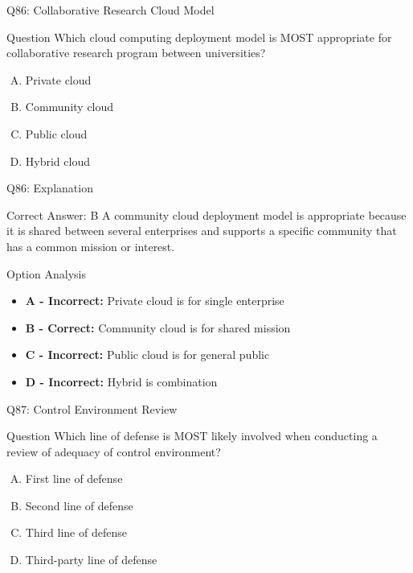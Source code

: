 \documentclass{beamer}
\begin{document}
	\begin{frame}{Q86: Collaborative Research Cloud Model}
		\begin{block}{Question}
			Which cloud computing deployment model is MOST appropriate for collaborative research program between universities?
		\end{block}
		\begin{enumerate}[(A)]
			\item Private cloud
			\item Community cloud
			\item Public cloud
			\item Hybrid cloud
		\end{enumerate}
	\end{frame}
	
	\begin{frame}{Q86: Explanation}
		\begin{block}{Correct Answer: B}
			A community cloud deployment model is appropriate because it is shared between several enterprises and supports a specific community that has a common mission or interest.
		\end{block}
		\begin{block}{Option Analysis}
			\begin{itemize}
				\item \textbf{A - Incorrect:} Private cloud is for single enterprise
				\item \textbf{B - Correct:} Community cloud is for shared mission
				\item \textbf{C - Incorrect:} Public cloud is for general public
				\item \textbf{D - Incorrect:} Hybrid is combination
			\end{itemize}
		\end{block}
	\end{frame}
	
	\begin{frame}{Q87: Control Environment Review}
		\begin{block}{Question}
			Which line of defense is MOST likely involved when conducting a review of adequacy of control environment?
		\end{block}
		\begin{enumerate}[(A)]
			\item First line of defense
			\item Second line of defense
			\item Third line of defense
			\item Third-party line of defense
		\end{enumerate}
	\end{frame}
	
\end{document}
